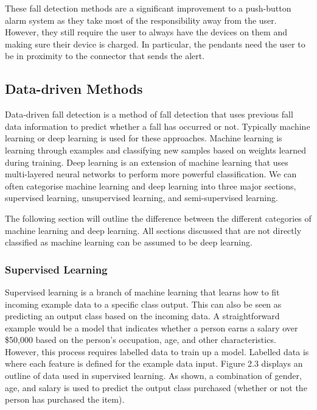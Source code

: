 These fall detection methods are a significant improvement to a push-button alarm system as they take most of the responsibility away from the user. However, they still require the user to always have the devices on them and making sure their device is charged. In particular, the pendants need the user to be in proximity to the connector that sends the alert. 

\subsection{Data-driven Methods}
Data-driven fall detection is a method of fall detection that uses previous fall data information to predict whether a fall has occurred or not. Typically machine learning or deep learning is used for these approaches. Machine learning is learning through examples and classifying new samples based on weights learned during training. Deep learning is an extension of machine learning that uses multi-layered neural networks to perform more powerful classification. We can often categorise machine learning and deep learning into three major sections, supervised learning, unsupervised learning, and semi-supervised learning. 

The following section will outline the difference between the different categories of machine learning and deep learning. All sections discussed that are not directly classified as machine learning can be assumed to be deep learning.


\subsubsection{Supervised Learning}
Supervised learning is a branch of machine learning that learns how to fit incoming example data to a specific class output. This can also be seen as predicting an output class based on the incoming data. A straightforward example would be a model that indicates whether a person earns a salary over \$50,000 based on the person's occupation, age, and other characteristics. However, this process requires labelled data to train up a model. Labelled data is where each feature is defined for the example data input. Figure 2.3 displays an outline of data used in supervised learning. As shown, a combination of gender, age, and salary is used to predict the output class purchased (whether or not the person has purchased the item).

